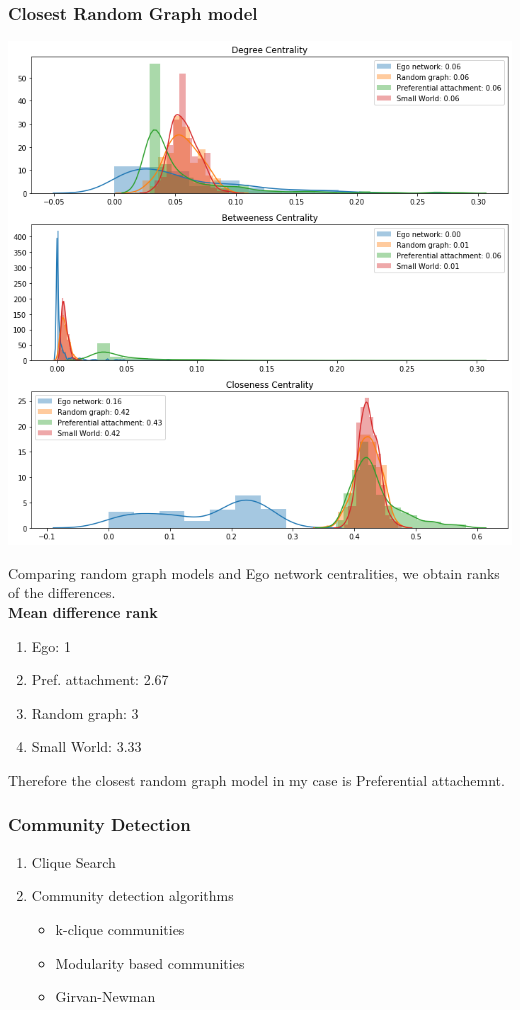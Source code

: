 \documentclass{beamer}
\begin{document}
\begin{frame}
\frametitle{Closest Random Graph model}
\begin{multicols}{2}
	\includegraphics[width=\columnwidth]{random_graph.png}
	\columnbreak
	
	Comparing random graph models and Ego network centralities, we obtain ranks of the differences.\\
	\textbf{Mean difference rank}
	\begin{enumerate}
	\item Ego: 1
	\item Pref. attachment: 2.67
	\item Random graph: 3
	\item Small World: 3.33
	\end{enumerate}
	Therefore the closest random graph model in my case is Preferential attachemnt.
	
\end{multicols}

\end{frame}


\begin{frame}
\frametitle{Community Detection}
\begin{enumerate}
\item Clique Search
\item Community detection algorithms
\begin{itemize}
\item k-clique communities
\item Modularity based communities
\item Girvan-Newman
\end{itemize}
\end{enumerate}
\end{frame}
\end{document}

